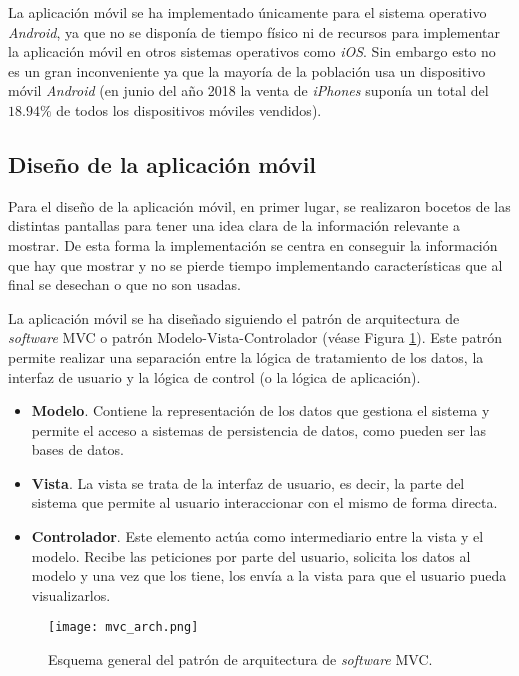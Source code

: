 La aplicación móvil se ha implementado únicamente para el sistema operativo \textit{Android}, ya que no se disponía de tiempo físico ni de recursos para implementar la aplicación móvil en otros sistemas operativos como \textit{iOS}. Sin embargo esto no es un gran inconveniente ya que la mayoría de la población usa un dispositivo móvil \textit{Android} (en junio del año 2018 la venta de \textit{iPhones} suponía un total del $18.94\%$ de todos los dispositivos móviles vendidos).

\subsection{Diseño de la aplicación móvil}

Para el diseño de la aplicación móvil, en primer lugar, se realizaron bocetos de las distintas pantallas para tener una idea clara de la información relevante a mostrar. De esta forma la implementación se centra en conseguir la información que hay que mostrar y no se pierde tiempo implementando características que al final se desechan o que no son usadas. 

La aplicación móvil se ha diseñado siguiendo el patrón de arquitectura de \textit{software} \ac{MVC} o patrón Modelo-Vista-Controlador (véase Figura \ref{fig:mvc}). Este patrón permite realizar una separación entre la lógica de tratamiento de los datos, la interfaz de usuario y la lógica de control (o la lógica de aplicación).

\begin{itemize}
\item \textbf{Modelo}. Contiene la representación de los datos que gestiona el sistema y permite el acceso a sistemas de persistencia de datos, como pueden ser las bases de datos.
\item \textbf{Vista}. La vista se trata de la interfaz de usuario, es decir, la parte del sistema que permite al usuario interaccionar con el mismo de forma directa.
\item \textbf{Controlador}. Este elemento actúa como intermediario entre la vista y el modelo. Recibe las peticiones por parte del usuario, solicita los datos al modelo y una vez que los tiene, los envía a la vista para que el usuario pueda visualizarlos.
\end{itemize}

\begin{figure}[!h]
\begin{center}
\texttt{[image: mvc\_arch.png]}
\caption{Esquema general del patrón de arquitectura de \textit{software} \ac{MVC}.}
\label{fig:mvc}
\end{center}
\end{figure}

